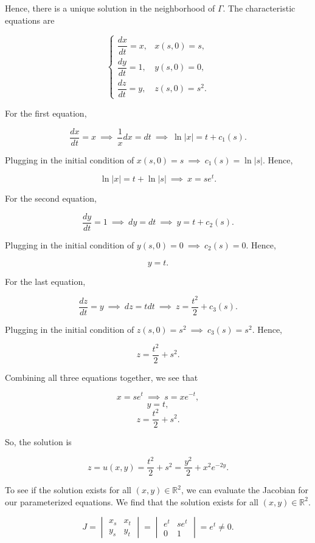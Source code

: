 \documentclass{article}
\begin{document}
\begin{flushleft}
Hence, there is a unique solution in the neighborhood of $\Gamma$. The characteristic equations are 

\[ \begin{cases} 
      \dfrac{dx}{dt}=x, &  x(s,0)=s, \\[1em]
      \dfrac{dy}{dt}=1, & y(s,0)=0, \\[1em] 
      \dfrac{dz}{dt}=y, & z(s,0)=s^2.
   \end{cases}
\]

For the first equation,

$$\frac{dx}{dt}=x ~\implies~ \frac{1}{x}dx = dt ~\implies~ \ln{|x|}=t+c_1(s).$$

Plugging in the initial condition of $ x(s,0)=s ~\implies~  c_1(s)=\ln{|s|}$. Hence,

$$\ln{|x|}=t+\ln{|s|} ~\implies~  x=se^t.$$

For the second equation,

$$\frac{dy}{dt}=1 ~\implies~ dy = dt ~\implies~ y=t+c_2(s).$$

Plugging in the initial condition of $ y(s,0)=0 ~\implies~  c_2(s)=0$. Hence,

$$y=t.$$

For the last equation,

$$\frac{dz}{dt}=y ~\implies~ dz = tdt ~\implies~ z=\frac{t^2}{2}+c_3(s).$$

Plugging in the initial condition of $ z(s,0)=s^2 ~\implies~  c_3(s)=s^2$. Hence,

$$z=\frac{t^2}{2}+s^2.$$

Combining all three equations together, we see that

$$x=se^t ~\implies~ s = xe^{-t},$$
$$y=t,$$
$$z=\frac{t^2}{2}+s^2.$$

So, the solution is

$$z=u(x,y)=\frac{t^2}{2}+s^2=\frac{y^2}{2}+x^2e^{-2y}.$$

To see if the solution exists for all $(x,y)\in\mathbb R^2$, we can evaluate the Jacobian for our parameterized equations. We find that the solution exists for all $(x,y)\in\mathbb R^2$.

$$J=\begin{vmatrix}
x_s & x_t \\
y_s & y_t
\end{vmatrix}=\begin{vmatrix}
e^t & se^t \\
0 & 1
\end{vmatrix}=e^t \neq 0.$$



\end{flushleft}
\end{document}
